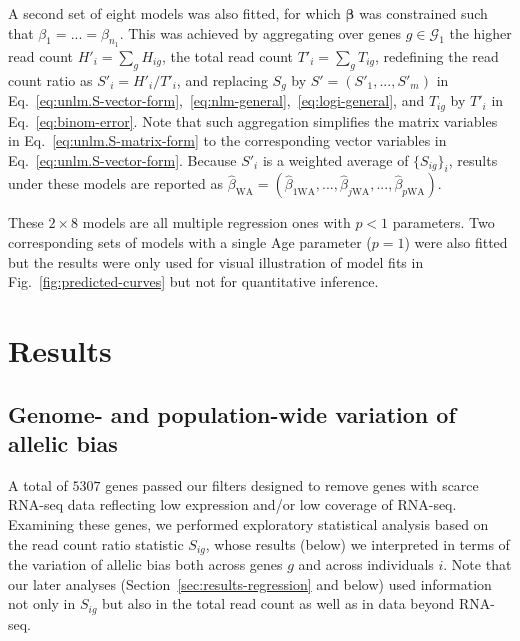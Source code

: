 \documentclass[12pt,letterpaper]{article}
\begin{document}
A second set of eight models was also
fitted, for which \(\boldsymbol{\beta}\) was constrained such that \(\beta_1 =
... = \beta_{n_1}\).  This was achieved by aggregating over genes
\(g\in\mathcal{G}_1\) the higher read count \(H'_i = \sum_g H_{ig}\), the
total read count \(T'_i = \sum_g T_{ig}\), redefining the read count ratio
as \(S'_i = H'_i / T'_i\), and replacing \(S_g\) by \(S'=(S'_1,...,S'_m)\) in
Eq.~\ref{eq:unlm.S-vector-form},~\ref{eq:nlm-general},~\ref{eq:logi-general}, and \(T_{ig}\) by \(T'_i\) in
Eq.~\ref{eq:binom-error}.  Note that such aggregation
simplifies the matrix variables in Eq.~\ref{eq:unlm.S-matrix-form} to the
corresponding vector variables in Eq.~\ref{eq:unlm.S-vector-form}.  Because \(S'_i\) is a
weighted average of \(\{S_{ig}\}_i\), results under these models are reported
as \(\hat{\beta}_\mathrm{WA} =
(\hat{\beta}_{1\mathrm{WA}},...,\hat{\beta}_{j\mathrm{WA}},...,\hat{\beta}_{p\mathrm{WA}})\).

These \(2\times 8\) models are all multiple regression ones with \(p<1\)
parameters.  Two corresponding sets of models with a single Age parameter
(\(p=1\)) were also fitted but the results were only used for visual
illustration of model fits in Fig.~\ref{fig:predicted-curves} but not for
quantitative inference.

\section{Results}

\subsection{Genome- and population-wide variation of allelic bias}

A total of \(5307\) genes passed our filters designed to remove genes with
scarce RNA-seq data reflecting low expression and/or low coverage of RNA-seq.
Examining these genes, we performed exploratory statistical analysis based on
the read count ratio statistic \(S_{ig}\), whose results (below) we
interpreted in terms of the variation of allelic bias both across genes \(g\)
and across individuals \(i\).  Note that our later analyses
(Section~\ref{sec:results-regression} and below) used
information not only in \(S_{ig}\) but also in the total read count as well as
in data beyond RNA-seq.
\end{document}
